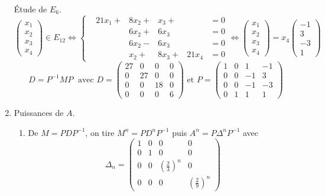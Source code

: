 \begin{enumerate}
\'Etude de $E_{6}$.
\begin{displaymath}
\begin{pmatrix} x_1 \\ x_2 \\ x_3 \\ x_4 \end{pmatrix} \in E_{12} \Leftrightarrow
\left\lbrace 
\begin{aligned}
  &21x_1 + &8x_2 + &x_3 +  &     &= 0 \\
  &       &6x_2 + &6x_3   &     &= 0 \\
  &       &6x_2 - &6x_3   &     &= 0 \\
  &       &x_2 +  &8x_3 + &21x_4 &= 0
\end{aligned}
\right. \Leftrightarrow
\begin{pmatrix} x_1 \\ x_2 \\ x_3 \\ x_4 \end{pmatrix}=
x_4 
\begin{pmatrix} -1 \\ 3 \\ -3 \\ 1 \end{pmatrix}
\end{displaymath}
  \begin{displaymath}
    D = P^{-1} M P\;\text{ avec }
D = 
\begin{pmatrix}
  27 & 0 & 0 & 0 \\ 0 & 27 & 0 & 0 \\ 0 & 0 & 18 & 0 \\ 0 & 0 & 0 & 6
\end{pmatrix} \text{ et }
P = 
\begin{pmatrix}
  1 & 0 & 1  & -1 \\
  0 & 0 & -1 & 3  \\
  0 & 0 & -1 & -3 \\
  0 & 1 &  1 & 1
\end{pmatrix}
  \end{displaymath}

  \item Puissances de $A$.
\begin{enumerate}
  \item De $M = PDP^{-1}$, on tire $M^n =PD^nP^{-1}$ puis $A^n = P\Delta^nP^{-1}$ avec 
\begin{displaymath}
\Delta_n = 
\begin{pmatrix}
  1 & 0 & 0               & 0 \\
  0 & 1 & 0               & 0 \\
  0 & 0 & (\frac{2}{3})^n & 0 \\
  0 & 0 & 0               & (\frac{2}{9})^n
\end{pmatrix}
\end{displaymath}


\end{enumerate}
\end{enumerate}
